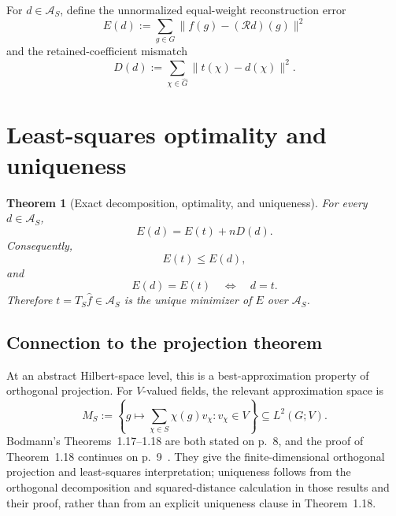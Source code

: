 \documentclass[11pt]{article}
\newtheorem{theorem}{Theorem}
\begin{document}
For $d\in\mathcal A_S$, define the unnormalized equal-weight reconstruction error
\begin{equation}
  E(d):=\sum_{g\in G}\|f(g)-(\mathcal R d)(g)\|^2
  \label{eq:error}
\end{equation}
and the retained-coefficient mismatch
\begin{equation}
  D(d):=\sum_{\chi\in\widehat G}\|t(\chi)-d(\chi)\|^2.
  \label{eq:mismatch}
\end{equation}

\section{Least-squares optimality and uniqueness}
\begin{theorem}[Exact decomposition, optimality, and uniqueness]
For every $d\in\mathcal A_S$,
\begin{equation}
  \boxed{E(d)=E(t)+nD(d).}
  \label{eq:pythagorean}
\end{equation}
Consequently,
\begin{equation}
  \boxed{E(t)\le E(d),}
  \label{eq:minimality}
\end{equation}
and
\begin{equation}
  \boxed{E(d)=E(t)\quad\Longleftrightarrow\quad d=t.}
  \label{eq:uniqueness}
\end{equation}
Therefore $t=T_S\widehat f\in\mathcal A_S$ is the unique minimizer of $E$ over
$\mathcal A_S$.
\end{theorem}

\subsection{Connection to the projection theorem}
At an abstract Hilbert-space level, this is a best-approximation property of orthogonal
projection.  For $V$-valued fields, the relevant approximation space is
\begin{equation}
  M_S:=\left\{g\longmapsto\sum_{\chi\in S}\chi(g)v_\chi:
       v_\chi\in V\right\}\subseteq L^2(G;V).
  \label{eq:approximation-subspace}
\end{equation}
Bodmann's Theorems~1.17--1.18 are both stated on p.~8, and the proof of Theorem~1.18 continues on
p.~9~\cite{Bodmann2009SignalRepresentations}.  They give the finite-dimensional orthogonal
projection and least-squares interpretation; uniqueness follows from the orthogonal decomposition
and squared-distance calculation in those results and their proof, rather than from an explicit
uniqueness clause in Theorem~1.18.
\end{document}
